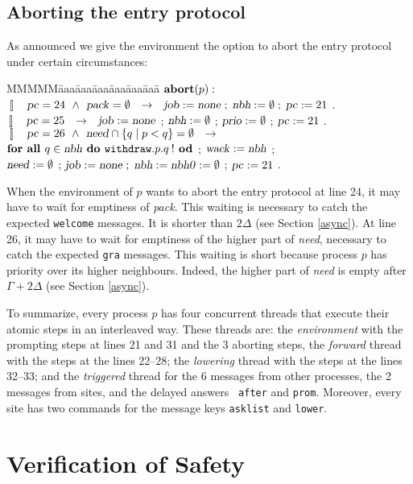 \documentclass[10pt]{article} \usepackage[english]{babel}
\newenvironment{tab}{\begin{tabbing}
MMMMM\=aaa\=aaa\=aaa\=aaa\=aaa\=aaa\= \kill}{\end{tabbing}}
\def\bar   {\mbox{$\,[ \! ]\,$}}
\def\S #1/{\mbox {\textsl{#1}}}
\def\B #1/{\mbox {\textbf{#1}}}
\def\T #1/{\mbox {\texttt{#1}}}
\def\Land   {\mbox{ $\;\land\;$ }}
\def\TO     {\mbox{$\quad\to\quad$}}
\begin{document}
\subsection{Aborting the entry protocol} \label{s.abort}

As announced we give the environment the option to abort the entry
protocol under certain circumstances:

\begin{tab}
  \> $ \B abort/(p): $ \+\+\\
  $ \bar\quad \S pc/ = 24 \Land \S pack/ = \emptyset
  \TO \S job/ := \S none/\;;\;
  \S nbh/ := \emptyset\;;\; \S pc/ := 21 $ .\\
  $ \bar\quad \S pc/ = 25 \TO \S job/ := \S none/ $ ; 
  $\S nbh/ := \emptyset$ ; $\S prio/ := \emptyset$ ; $\S pc/ := 21 $ .\\
  $ \bar\quad \S pc/ = 26 \Land
  \S need/\cap\{q\mid p < q\} = \emptyset \TO$ \\
  \>\> $ \B for all /q\in\S nbh/ \B\ do /\T withdraw/.p.q\:!\B\ od/ $ ;
  $\S wack/ := \S nbh/ $ ; \\
  \>\> $ \S need/ := \emptyset $ ; $ \S job/ := \S none/\;;\;\S nbh/
  := \S nbh0/ := \emptyset$ ; $ \S pc/ := 21 $ .
\end{tab}

When the environment of $p$ wants to abort the entry protocol at line
24, it may have to wait for emptiness of \S pack/.  This waiting is
necessary to catch the expected \T welcome/ messages.  It is shorter
than $2\Delta$ (see Section \ref{async}).  At line 26, it may have to
wait for emptiness of the higher part of \S need/, necessary to catch
the expected \T gra/ messages.  This waiting is short because process
$p$ has priority over its higher neighbours. Indeed, the higher part
of \S need/ is empty after $\Gamma + 2\Delta$ (see Section
\ref{async}).

To summarize, every process $p$ has four concurrent threads that
execute their atomic steps in an interleaved way.  These threads are:
the \emph{environment} with the prompting steps at lines 21 and 31 and
the 3 aborting steps, the \emph{forward} thread with the steps at the
lines 22--28; the \emph{lowering} thread with the steps at the lines
32--33; and the \emph{triggered} thread for the 6 messages from other
processes, the 2 messages from sites, and the delayed answers \T
after/ and \T prom/.  Moreover, every site has two commands for the
message keys \T asklist/ and \T lower/.

\section{Verification of Safety}
\label{algorithm}
\end{document}
